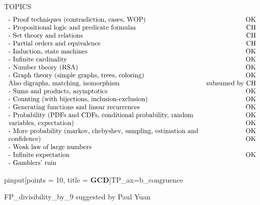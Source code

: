 \documentclass[quiz]{mcs}
\renewcommand{\examspace}[]{}
\begin{document}
\final

\begin{editingnotes}
TOPICS
\[\begin{tabular}{lr}
- Proof techniques (contradiction, cases, WOP)    &               OK\\
- Propositional logic and predicate formulas       &         CH\\
- Set theory and relations                          &        CH\\
- Partial orders and equivalence                     &       CH\\
- Induction, state machines                           &           OK\\
- Infinite cardinality                                 &          OK\\
- Number theory (RSA)                                   &         OK\\
- Graph theory (simple graphs, trees, coloring)          &        OK\\
    Also digraphs, matching, isomorphism            & subsumed by CH\\
- Sums and products, asymptotics         &                        OK\\
- Counting (with bijections, inclusion-exclusion)  &              OK\\
- Generating functions and linear recurrences       &             OK\\
- Probability (PDFs and CDFs, conditional probability, random &   OK\\
    variables, expectation)                                    &  OK\\
- More probability (markov, chebyshev, sampling, estimation and & OK\\
    confidence)                                               &   OK\\
- Weak law of large numbers\\
- Infinite expectation                                         &  OK\\
- Gamblers' ruin
\end{tabular}\]\end{editingnotes}


\begin{editingnotes}
\examspace
pinput[points = 10, title = \textbf{GCD}]{TP\_ax=b\_congruence}

FP\_divisibility\_by\_9  suggested by Paul Yuan
\end{editingnotes}
\end{document}
